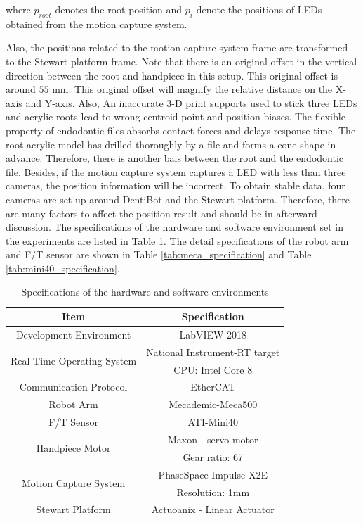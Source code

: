 where $p_{root}$ denotes the root position and $p_{i}$ denote the positions of LEDs obtained from the motion capture system. 
\par
Also, the positions related to the motion capture system frame are transformed to the Stewart platform frame. Note that there is an original offset in the vertical direction between the root and handpiece in this setup. This original offset is around $55$ mm. This original offset will magnify the relative distance on the X-axis and Y-axis. Also, An inaccurate 3-D print supports used to stick three LEDs and acrylic roots lead to wrong centroid point and position biases. The flexible property of endodontic files absorbs contact forces and delays response time. The root acrylic model has drilled thoroughly by a file and forms a cone shape in advance. Therefore, there is another bais between the root and the endodontic file. Besides, if the motion capture system captures a LED with less than three cameras, the position information will be incorrect. To obtain stable data, four cameras are set up around DentiBot and the Stewart platform. Therefore, there are many factors to affect the position result and should be in afterward discussion.
\newpage
The specifications of the hardware and software environment set in the experiments are listed in Table \ref{tab:exp_specification}. The detail specifications of the robot arm and F/T sensor are shown in Table \ref{tab:meca_specification} and Table \ref{tab:mini40_specification}.

\begin{table}[htbp]
\centering
\tabcolsep=20pt
\arrayrulewidth=1pt
\caption{Specifications of the hardware and software environments}
\label{tab:exp_specification}
\par
\begin{tabular}{|c|c|} 
\hline
\rowcolor{lightgray!40}Item						&Specification				\\	\hline
Development Environment							&LabVIEW 2018					\\	\hline
\multirow{2}{*}{Real-Time Operating System}		&National Instrument-RT target	\\
												&CPU: Intel Core 8				\\	\hline
Communication Protocol							&EtherCAT						\\	\hline
Robot Arm										&Mecademic-Meca500				\\	\hline
F/T Sensor										&ATI-Mini40						\\	\hline
\multirow{2}{*}{Handpiece Motor}							&Maxon - servo motor				\\
												&Gear ratio: 67					\\	\hline
\multirow{2}{*}{Motion Capture System}			&PhaseSpace-Impulse X2E 		\\
												&Resolution: 1mm				\\	\hline
Stewart Platform								&Actuoanix - Linear Actuator				\\	
\hline
\end{tabular}
\end{table}


